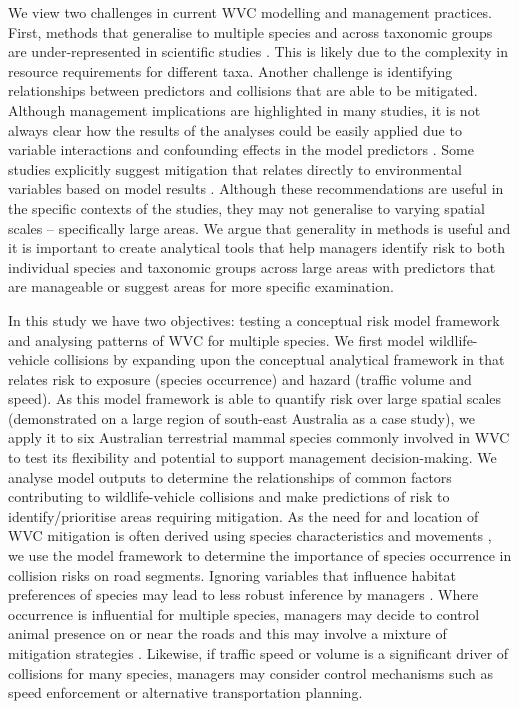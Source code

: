 We view two challenges in current WVC modelling and management practices.  First, methods that generalise to multiple species and across taxonomic groups are under-represented in scientific studies \citep[see][]{farm12}.  This is likely due to the complexity in resource requirements for different taxa.  Another challenge is identifying relationships between predictors and collisions that are able to be mitigated.  Although management implications are highlighted in many studies, it is not always clear how the results of the analyses could be easily applied due to variable interactions and confounding effects in the model predictors \citep{guns11}.  Some studies explicitly suggest mitigation that relates directly to environmental variables based on model results \citep[see][]{gril09}.  Although these recommendations are useful in the specific contexts of the studies, they may not generalise to varying spatial scales -- specifically large areas. We argue that generality in methods is useful and it is important to create analytical tools that help managers identify risk to both individual species and taxonomic groups across large areas with predictors that are manageable or suggest areas for more specific examination.

In this study we have two objectives: testing a conceptual risk model framework and analysing patterns of WVC for multiple species.  We first model wildlife-vehicle collisions by expanding upon the conceptual analytical framework in  that relates risk to exposure (species occurrence) and hazard (traffic volume and speed).  As this model framework is able to quantify risk over large spatial scales (demonstrated on a large region of south-east Australia as a case study), we apply it to six Australian terrestrial mammal species commonly involved in WVC to test its flexibility and potential to support management decision-making.  We analyse model outputs to determine the relationships of common factors contributing to wildlife-vehicle collisions and make predictions of risk to identify/prioritise areas requiring mitigation.  As the need for and location of WVC mitigation is often derived using species characteristics and movements \citep[e.g.][]{clev02}, we use the model framework to determine the importance of species occurrence in collision risks on road segments.  Ignoring variables that influence habitat preferences of species may lead to less robust inference by managers \citep{roge09}.  Where occurrence is influential for multiple species, managers may decide to control animal presence on or near the roads and this may involve a mixture of mitigation strategies \citep[see][]{beck10}.  Likewise, if traffic speed or volume is a significant driver of collisions for many species, managers may consider control mechanisms such as speed enforcement or alternative transportation planning.

